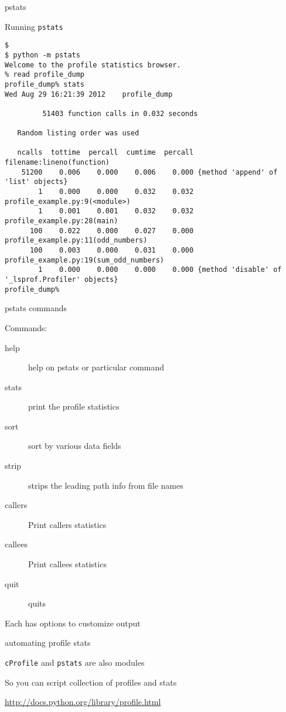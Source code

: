 \documentclass{beamer}
\begin{document}
\begin{frame}[fragile]{pstats}

{\Large Running \verb|pstats|}
{\small
\begin{verbatim}
$
$ python -m pstats
Welcome to the profile statistics browser.
% read profile_dump
profile_dump% stats
Wed Aug 29 16:21:39 2012    profile_dump

         51403 function calls in 0.032 seconds

   Random listing order was used

   ncalls  tottime  percall  cumtime  percall filename:lineno(function)
    51200    0.006    0.000    0.006    0.000 {method 'append' of 'list' objects}
        1    0.000    0.000    0.032    0.032 profile_example.py:9(<module>)
        1    0.001    0.001    0.032    0.032 profile_example.py:28(main)
      100    0.022    0.000    0.027    0.000 profile_example.py:11(odd_numbers)
      100    0.003    0.000    0.031    0.000 profile_example.py:19(sum_odd_numbers)
        1    0.000    0.000    0.000    0.000 {method 'disable' of '_lsprof.Profiler' objects}
profile_dump% 
\end{verbatim}
}
\end{frame} 

\begin{frame}[fragile]{pstats commands}

{\Large Commands:}

\begin{description}
  \item[help] help on pstats or particular command
  \item[stats] print the profile statistics
  \item[sort] sort by various data fields
  \item[strip] strips the leading path info from file names
  \item[callers] Print callers statistics
  \item[callees] Print callees statistics
  \item[quit] quits
\end{description}
{\large Each has options to customize output}

\end{frame} 

\begin{frame}[fragile]{automating profile stats}

{\Large \verb|cProfile| and \verb|pstats| are also modules}

\vfill
{\Large So you can script collection of profiles and stats}

\vfill
\url{http://docs.python.org/library/profile.html}

\end{frame} 
\end{document}
